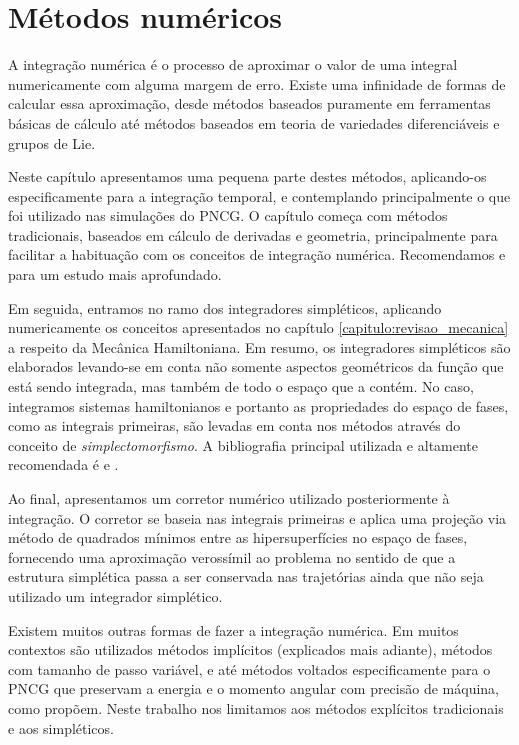 \chapter{Métodos numéricos}\label{capitulo:metodos_numericos}

A integração numérica é o processo de aproximar o valor de uma integral numericamente com alguma margem de erro. Existe uma infinidade de formas de calcular essa aproximação, desde métodos baseados puramente em ferramentas básicas de cálculo até métodos baseados em teoria de variedades diferenciáveis e grupos de Lie.

Neste capítulo apresentamos uma pequena parte destes métodos, aplicando-os especificamente para a integração temporal, e contemplando principalmente o que foi utilizado nas simulações do PNCG. O capítulo começa com métodos tradicionais, baseados em cálculo de derivadas e geometria, principalmente para facilitar a habituação com os conceitos de integração numérica. Recomendamos \cite{alexandre_megiorin_roma_metodos_nodate} e \cite{Butcher2016-jx} para um estudo mais aprofundado.

Em seguida, entramos no ramo dos integradores simpléticos, aplicando numericamente os conceitos apresentados no capítulo \ref{capitulo:revisao_mecanica} a respeito da Mecânica Hamiltoniana. Em resumo, os integradores simpléticos são elaborados levando-se em conta não somente aspectos geométricos da função que está sendo integrada, mas também de todo o espaço que a contém. No caso, integramos sistemas hamiltonianos e portanto as propriedades do espaço de fases, como as integrais primeiras, são levadas em conta nos métodos através do conceito de \textit{simplectomorfismo}. A bibliografia principal utilizada e altamente recomendada é \cite{Hairer2006-oz} e \cite{Leimkuhler2005}.

Ao final, apresentamos um corretor numérico utilizado posteriormente à integração. O corretor se baseia nas integrais primeiras e aplica uma projeção via método de quadrados mínimos entre as hipersuperfícies no espaço de fases, fornecendo uma aproximação verossímil ao problema no sentido de que a estrutura simplética passa a ser conservada nas trajetórias ainda que não seja utilizado um integrador simplético.

Existem muitos outras formas de fazer a integração numérica. Em muitos contextos são utilizados métodos implícitos (explicados mais adiante), métodos com tamanho de passo variável, e até métodos voltados especificamente para o PNCG que preservam a energia e o momento angular com precisão de máquina, como \cite{Kotovych2002} propõem. Neste trabalho nos limitamos aos métodos explícitos tradicionais e aos simpléticos.


